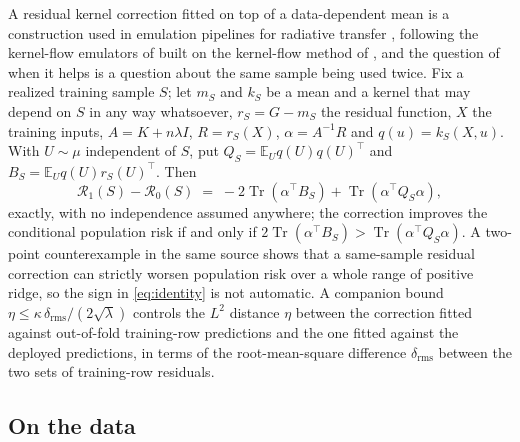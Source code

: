 \documentclass[11pt]{article}
\theoremstyle{definition}
\DeclareMathOperator{\Tr}{Tr}
\newcommand{\E}{\mathbb{E}}
\begin{document}
A residual kernel correction fitted on top of a data-dependent mean is a construction used in
emulation pipelines for radiative transfer \cite{Shmalo26a,Shmalo26b}, following the kernel-flow
emulators of \cite{Lamminpaa} built on the kernel-flow method of \cite{OwhadiYoo}, and the question of when it helps is a question about the same sample
being used twice. Fix a realized training sample $S$; let $m_S$ and $k_S$ be a mean and a kernel that
may depend on $S$ in any way whatsoever, $r_S=G-m_S$ the residual function, $X$ the training inputs,
$A=K+n\lambda I$, $R=r_S(X)$, $\alpha=A^{-1}R$ and $q(u)=k_S(X,u)$. With $U\sim\mu$ independent of
$S$, put $Q_S=\E_U q(U)q(U)^\top$ and $B_S=\E_U q(U)r_S(U)^\top$. Then \cite{PN24}
\begin{equation}
\mathcal R_1(S)-\mathcal R_0(S)\;=\;-2\Tr(\alpha^\top B_S)+\Tr(\alpha^\top Q_S\alpha),
\label{eq:identity}
\end{equation}
exactly, with no independence assumed anywhere; the correction improves the conditional population
risk if and only if $2\Tr(\alpha^\top B_S)>\Tr(\alpha^\top Q_S\alpha)$. A two-point counterexample
in the same source shows that a same-sample residual correction can strictly worsen population risk
over a whole range of positive ridge, so the sign in \eqref{eq:identity} is not automatic. A
companion bound $\eta\le\kappa\,\delta_{\mathrm{rms}}/(2\sqrt\lambda)$ controls the $L^2$ distance
$\eta$ between the correction fitted against out-of-fold training-row predictions and the one fitted
against the deployed predictions, in terms of the root-mean-square difference $\delta_{\mathrm{rms}}$
between the two sets of training-row residuals.

\subsection{On the data}
\end{document}
